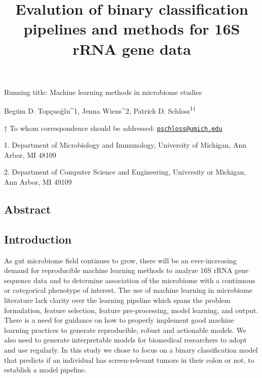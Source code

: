 \documentclass[11pt,]{article}
\title{\textbf{Evalution of binary classification pipelines and methods for 16S
rRNA gene data}}
\author{}
\date{}
\begin{document}
\maketitle

\vspace{35mm}

Running title: Machine learning methods in microbiome studies

\vspace{35mm}

Begüm D. Topçuoğlu\^{}1, Jenna Wiens\^{}2, Patrick D.
Schloss\textsuperscript{1\(\dagger\)}

\vspace{40mm}

\(\dagger\) To whom correspondence should be addressed:
\href{mailto:pschloss@umich.edu}{\nolinkurl{pschloss@umich.edu}}

1. Department of Microbiology and Immunology, University of Michigan,
Ann Arbor, MI 48109

2. Department of Computer Science and Engineering, University or
Michigan, Ann Arbor, MI 49109

\newpage

\linenumbers

\subsection{Abstract}\label{abstract}

\newpage

\subsection{Introduction}\label{introduction}

As gut microbiome field continues to grow, there will be an
ever-increasing demand for reproducible machine learning methods to
analyze 16S rRNA gene sequence data and to determine association of the
microbiome with a continuous or categorical phenotype of interest. The
use of machine learning in microbiome literature lack clarity over the
learning pipeline which spans the problem formulation, feature
selection, feature pre-processing, model learning, and output. There is
a need for guidance on how to properly implement good machine learning
practices to generate reproducible, robust and actionable models. We
also need to generate interpretable models for biomedical researchers to
adopt and use regularly. In this study we chose to focus on a binary
classification model that predicts if an individual has screen-relevant
tumors in their colon or not, to establish a model pipeline.
\end{document}
